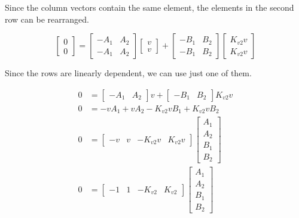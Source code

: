 Since the column vectors contain the same element, the elements in the second
row can be rearranged.

\begin{equation*}
  \begin{bmatrix}
    0 \\
    0
  \end{bmatrix} =
  \begin{bmatrix}
    -A_1 & A_2 \\
    -A_1 & A_2
  \end{bmatrix}
  \begin{bmatrix}
    v \\
    v
  \end{bmatrix} +
  \begin{bmatrix}
    -B_1 & B_2 \\
    -B_1 & B_2
  \end{bmatrix}
  \begin{bmatrix}
    K_{v2} v \\
    K_{v2} v
  \end{bmatrix}
\end{equation*}

Since the rows are linearly dependent, we can use just one of them.

\begin{align*}
  0 &=
    \begin{bmatrix}
      -A_1 & A_2
    \end{bmatrix} v +
    \begin{bmatrix}
      -B_1 & B_2
    \end{bmatrix} K_{v2} v \\
  0 &= -v A_1 + v A_2 - K_{v2} v B_1 + K_{v2} v B_2 \\
  0 &=
    \begin{bmatrix}
      -v & v & -K_{v2} v & K_{v2} v
    \end{bmatrix}
    \begin{bmatrix}
      A_1 \\
      A_2 \\
      B_1 \\
      B_2
    \end{bmatrix} \\
  0 &=
    \begin{bmatrix}
      -1 & 1 & -K_{v2} & K_{v2}
    \end{bmatrix}
    \begin{bmatrix}
      A_1 \\
      A_2 \\
      B_1 \\
      B_2
    \end{bmatrix}
\end{align*}

